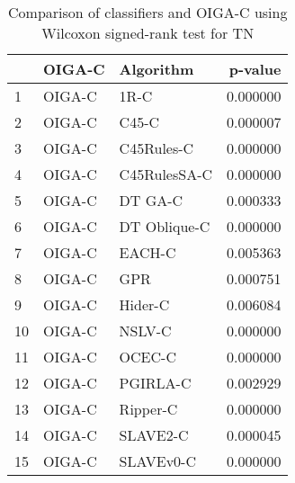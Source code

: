 \begin{table}
\footnotesize
\caption{Comparison of classifiers and OIGA-C using Wilcoxon signed-rank test for TN}
\label{tab:OIGA-C wilcoxon TN comparison}
\begin{tabular}{lllr}
\hline
 & OIGA-C & Algorithm & p-value \\
\hline
1 & OIGA-C & 1R-C & 0.000000 \\
2 & OIGA-C & C45-C & 0.000007 \\
3 & OIGA-C & C45Rules-C & 0.000000 \\
4 & OIGA-C & C45RulesSA-C & 0.000000 \\
5 & OIGA-C & DT GA-C & 0.000333 \\
6 & OIGA-C & DT Oblique-C & 0.000000 \\
7 & OIGA-C & EACH-C & 0.005363 \\
8 & OIGA-C & GPR & 0.000751 \\
9 & OIGA-C & Hider-C & 0.006084 \\
10 & OIGA-C & NSLV-C & 0.000000 \\
11 & OIGA-C & OCEC-C & 0.000000 \\
12 & OIGA-C & PGIRLA-C & 0.002929 \\
13 & OIGA-C & Ripper-C & 0.000000 \\
14 & OIGA-C & SLAVE2-C & 0.000045 \\
15 & OIGA-C & SLAVEv0-C & 0.000000 \\
\hline
\end{tabular}
\end{table}
